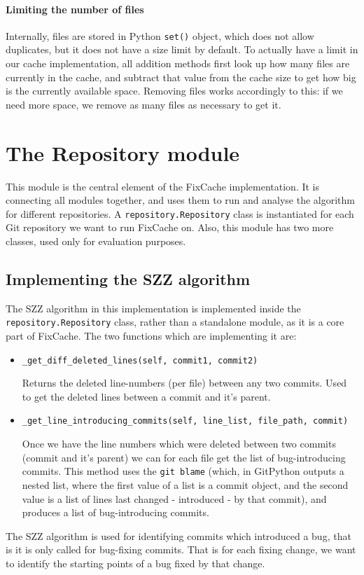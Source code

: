 \documentclass[12pt,twoside,notitlepage]{report}
\newcommand{\fxch}{FixCache}
\begin{document}
\paragraph{Limiting the number of files}
Internally, files are stored in Python \texttt{set()} object, which does not allow duplicates, but it does not have a size limit by default. To actually have a limit in our cache implementation, all addition methods first look up how many files are currently in the cache, and subtract that value from the cache size to get how big is the currently available space. Removing files works accordingly to this: if we need more space, we remove as many files as necessary to get it.
\section{The Repository module}
This module is the central element of the \fxch{} implementation. It is connecting all modules together, and uses them to run and analyse the algorithm for different repositories. A \texttt{repository.Repository} class is instantiated for each Git repository we want to run \fxch{} on. Also, this module has two more classes, used only for evaluation purposes. 
\subsection{Implementing the SZZ algorithm}
The SZZ algorithm in this implementation is implemented inside the \texttt{repository.Repository} class, rather than a standalone module, as it is a core part of \fxch{}. The two functions which are implementing it are:
\begin{itemize}
\item \texttt{\_get\_diff\_deleted\_lines(self, commit1, commit2)}

Returns the deleted line-numbers (per file) between any two commits. Used to get the deleted lines between a commit and it's parent.
\item \texttt{\_get\_line\_introducing\_commits(self, line\_list, file\_path, commit)}

Once we have the line numbers which were deleted between two commits (commit and it's parent) we can for each file get the list of bug-introducing commits. This method uses the \texttt{git blame} (which, in GitPython outputs a nested list, where the first value of a list is a commit object, and the second value is a list of lines last changed - introduced - by that commit), and produces a list of bug-introducing commits.
\end{itemize}
The SZZ algorithm is used for identifying commits which introduced a bug, that is it is only called for bug-fixing commits. That is for each fixing change, we want to identify the starting points of a bug fixed by that change.
\end{document}
